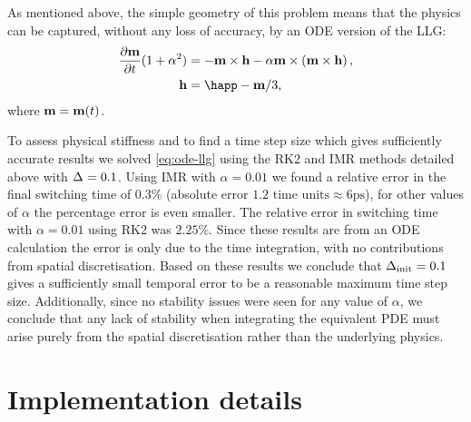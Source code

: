 As mentioned above, the simple geometry of this problem means that the physics can be captured, without any loss of accuracy, by an ODE version of the LLG:
\begin{equation}
  \label{eq:ode-llg}
  \begin{aligned}
    \dmdt (1 + \dampc^2) &= - \mv \times \hv - \dampc \mv \times \left( \mv \times \hv \right), \\
    \hv &= \happ - \mv/3,
  \end{aligned}
\end{equation}
where $\boldsymbol{\mathrm{m}} = \boldsymbol{\mathrm{m}}(t)$.

To assess physical stiffness and to find a time step size which gives sufficiently accurate results we solved \cref{eq:ode-llg} using the RK2 and IMR methods detailed above with $\Delta_{} = 0.1$.
Using IMR with $\alpha = 0.01$ we found a relative error in the final switching time of $0.3\%$ (absolute error  $1.2 \text{ time units} \approx 6\text{ps}$), for other values of $\alpha$ the percentage error is even smaller.
The relative error in switching time with $\alpha = 0.01$ using RK2 was $2.25\%$.
Since these results are from an ODE calculation the error is only due to the time integration, with no contributions from spatial discretisation.
Based on these results we conclude that $\Delta_{\mathrm{init}} = 0.1$ gives a sufficiently small temporal error to be a reasonable maximum time step size.
Additionally, since no stability issues were seen for any value of $\alpha$, we conclude that any lack of stability when integrating the equivalent PDE must arise purely from the spatial discretisation rather than the underlying physics.



\section{Implementation details}

